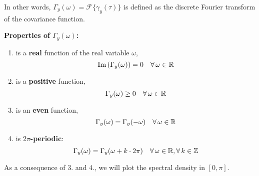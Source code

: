 In other words, $\Gamma_y(\omega)=\mathcal{F}\{\gamma_y(\tau)\}$ is defined as the discrete Fourier transform of the covariance function.

\textbf{Properties of $\Gamma_{y}(\omega)$:}
\begin{enumerate}
	\item is a \textbf{real} function of the real variable $\omega$,
	$$
		\Im\left(\Gamma_{y}(\omega)\right)=0 \quad \forall \omega \in \RR
	$$
	\item is a \textbf{positive} function,
	$$
		\Gamma_{y}(\omega) \geq 0 \quad \forall \omega \in \RR
	$$
	\item is an \textbf{even} function,
	$$
		\Gamma_{y}(\omega)=\Gamma_{y}(-\omega) \quad \forall \omega \in \RR
	$$
	\item is \textbf{$2\pi$-periodic}:
	$$
		\Gamma_{y}(\omega)=\Gamma_{y}(\omega+k \cdot 2 \pi) \quad \forall \omega \in \RR, \forall k \in \mathbb{Z}
	$$
\end{enumerate}

\begin{rem}
As a consequence of 3. and 4., we will plot the spectral density in $[0, \pi]$.
\end{rem}

